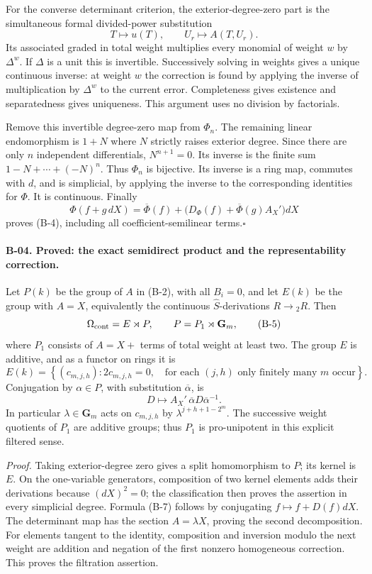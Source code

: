 For the converse determinant criterion, the exterior-degree-zero
part is the simultaneous formal divided-power substitution
\[
 T\longmapsto u(T),\qquad U_r\longmapsto A(T,U_r).
\]
Its associated graded in total weight multiplies every monomial
of weight $w$ by $\Delta^w$. If $\Delta$ is a unit this is invertible.
Successively solving in weights gives a unique continuous inverse:
at weight $w$ the correction is found by applying the inverse of
multiplication by $\Delta^w$ to the current error. Completeness gives
existence and separatedness gives uniqueness. This argument uses no
division by factorials.

Remove this invertible degree-zero map from $\Phi_n$. The remaining
linear endomorphism is $1+N$ where $N$ strictly raises exterior
degree. Since there are only $n$ independent differentials,
$N^{n+1}=0$. Its inverse is the finite sum
$1-N+\cdots+(-N)^n$. Thus $\Phi_n$ is bijective. Its inverse is
a ring map, commutes with $d$, and is simplicial, by applying the
inverse to the corresponding identities for $\Phi$. It is continuous.
Finally
\[
 \Phi(f+g\,dX)=\overline\Phi(f)+
       \bigl(D_\Phi(f)+\overline\Phi(g)A_X'\bigr)dX
\]
proves (B-4), including all coefficient-semilinear terms.\hfill$\square$

\paragraph{B-04. Proved: the exact semidirect product and the
representability correction.}
Let $P(k)$ be the group of $A$ in (B-2), with all $B_i=0$, and
let $E(k)$ be the group with $A=X$, equivalently the continuous
$\widehat S$-derivations $R\to{}_2R$. Then
\[
 \Omega_{\rm cont}=E\rtimes P,
 \qquad P=P_1\rtimes\mathbf G_m,
 \tag{B-5}
\]
where $P_1$ consists of $A=X+$ terms of total weight at least two.
The group $E$ is additive, and as a functor on rings it is
\[
 E(k)=\left\{(c_{m,j,h}):2c_{m,j,h}=0,\quad
       \text{for each $(j,h)$ only finitely many $m$ occur}\right\}.
 \tag{B-6}
\]
Conjugation by $\alpha\in P$, with substitution $\overline\alpha$,
is
\[
 D\longmapsto A_X'\,\overline\alpha D\overline\alpha^{-1}.
 \tag{B-7}
\]
In particular $\lambda\in\mathbf G_m$ acts on $c_{m,j,h}$ by
$\lambda^{j+h+1-2^m}$. The successive weight quotients of $P_1$
are additive groups; thus $P_1$ is pro-unipotent in this explicit
filtered sense.

\emph{Proof.}
Taking exterior-degree zero gives a split homomorphism to $P$;
its kernel is $E$. On the one-variable generators, composition of
two kernel elements adds their derivations because $(dX)^2=0$;
the classification then proves the assertion in every simplicial
degree. Formula (B-7) follows by conjugating
$f\mapsto f+D(f)dX$. The determinant map has the section
$A=\lambda X$, proving the second decomposition. For elements tangent
to the identity, composition and inversion modulo the next weight
are addition and negation of the first nonzero homogeneous
correction. This proves the filtration assertion.

